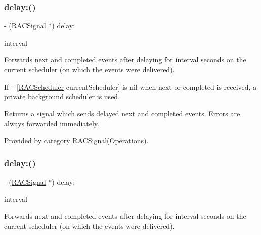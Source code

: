 \subsubsection{\texorpdfstring{delay\+:()}{delay:()}\hspace{0.1cm}{\footnotesize\ttfamily [2/3]}}
{\footnotesize\ttfamily -\/ (\mbox{\hyperlink{interface_r_a_c_signal}{R\+A\+C\+Signal}} $\ast$) delay\+: \begin{DoxyParamCaption}\item[{(N\+S\+Time\+Interval)}]{interval }\end{DoxyParamCaption}}

Forwards {\ttfamily next} and {\ttfamily completed} events after delaying for {\ttfamily interval} seconds on the current scheduler (on which the events were delivered).

If +\mbox{[}\mbox{\hyperlink{interface_r_a_c_scheduler}{R\+A\+C\+Scheduler}} current\+Scheduler\mbox{]} is nil when {\ttfamily next} or {\ttfamily completed} is received, a private background scheduler is used.

Returns a signal which sends delayed {\ttfamily next} and {\ttfamily completed} events. Errors are always forwarded immediately. 

Provided by category \mbox{\hyperlink{category_r_a_c_signal_07_operations_08_adc28e5c64d2e6ec8c5ab8465fa6c89b4}{R\+A\+C\+Signal(\+Operations)}}.

\mbox{\label{interface_r_a_c_signal_adc28e5c64d2e6ec8c5ab8465fa6c89b4}} 
\subsubsection{\texorpdfstring{delay\+:()}{delay:()}\hspace{0.1cm}{\footnotesize\ttfamily [3/3]}}
{\footnotesize\ttfamily -\/ (\mbox{\hyperlink{interface_r_a_c_signal}{R\+A\+C\+Signal}} $\ast$) delay\+: \begin{DoxyParamCaption}\item[{(N\+S\+Time\+Interval)}]{interval }\end{DoxyParamCaption}}

Forwards {\ttfamily next} and {\ttfamily completed} events after delaying for {\ttfamily interval} seconds on the current scheduler (on which the events were delivered).


